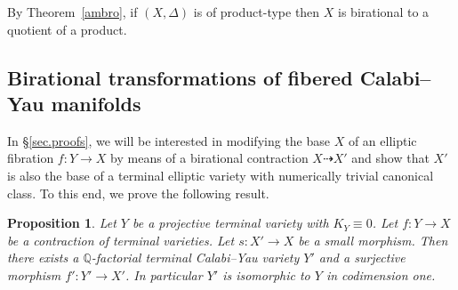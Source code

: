 \documentclass{amsart}[12pt,a4paper]
\newtheorem{proposition}[theorem]{Proposition}
\theoremstyle{definition}
\begin{document}
 By Theorem~\ref{ambro}, if $(X,\Delta)$ is of product-type then $X$ is birational to a quotient of a product. 

\subsection{Birational transformations of fibered Calabi--Yau manifolds}\label{sect.trans.fib.cy}

In \S \ref{sec.proofs}, we will be interested in modifying the base $X$ of an elliptic fibration $f \colon Y \to X$ by means of a birational contraction $X \dashrightarrow X'$ and show that $X'$ is also the base of a terminal elliptic variety with numerically trivial canonical class.
To this end, we prove the following result.

\begin{proposition}
\label{small.qfact.prop}
Let $Y$ be a projective terminal variety with $K_Y \equiv 0$. 
Let $f \colon Y \to X$ be a contraction of terminal varieties.
Let $s \colon X' \to X$ be a small morphism.
Then there exists a $\mathbb{Q}$-factorial terminal Calabi--Yau variety $Y'$ and a surjective morphism $f' \colon Y' \to X'$.
 In particular $Y'$ is isomorphic to $Y$ in codimension one.
\end{proposition}
\end{document}
